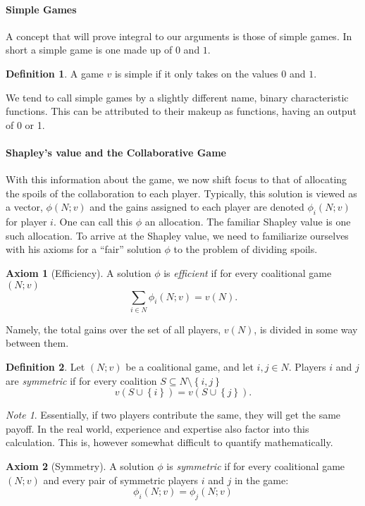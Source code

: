 \documentclass[12pt,letterpaper,final]{article}
\theoremstyle{plain}
\theoremstyle{plain}
\theoremstyle{plain}
\theoremstyle{plain}
\theoremstyle{plain}
\theoremstyle{plain}
\theoremstyle{plain}
\theoremstyle{definition}
\newtheorem{definition}{Definition}[section]
\theoremstyle{definition}
\theoremstyle{definition}
\theoremstyle{definition}
\theoremstyle{definition}
\newtheorem{axiom}{Axiom}[section]
\theoremstyle{remark}
\theoremstyle{remark}
\newtheorem*{note}{Note}
\theoremstyle{remark}
\theoremstyle{remark}
\begin{document}
\paragraph{Simple Games}

A concept that will prove integral to our arguments is those of simple
games. In short a simple game is one made up of \(0\) and \(1\).

\begin{definition}
  A game \(v\) is simple if it only takes on the values \(0\) and
  \(1\).
\end{definition}

We tend to call simple games by a slightly different name, binary
characteristic functions. This can be attributed to their makeup as
functions, having an output of 0 or 1.

\paragraph{Shapley's value and the Collaborative Game}

With this information about the game, we now shift focus to that of
allocating the spoils of the collaboration to each player. Typically,
this solution is viewed as a vector, \(\phi(N;v)\) and the gains
assigned 
to each player are denoted \(\phi_i(N;v)\) for player \(i\). One can
call 
this \(\phi\) an allocation. The familiar
Shapley value is one such allocation. To arrive at the Shapley value,
we need 
to familiarize ourselves with his axioms for a ``fair'' solution
\(\phi\) to the problem of dividing spoils. 

\begin{axiom}[Efficiency]\label{ax:eff}
  A solution \(\phi\) is \emph{efficient} if for every
  coalitional game \((N;v)\)
  \[\sum_{i \in N} \phi_i(N;v) = v(N).\] 
\end{axiom}

Namely, the total gains over the set of all players, \(v(N)\), is
divided in some way between them.

\begin{definition}
  Let \((N;v)\) be a coalitional game, and let \(i, j \in N\). Players
  \(i\) 
  and \(j\) are \emph{symmetric} if for every coalition 
  \(S \subseteq N \setminus \left\{i,j\right\} \)
  \[v(S\cup \left\{i\right\}) = v(S \cup \left\{j\right\}).\]
\end{definition}

\begin{note}
  Essentially, if two players contribute the same, 
  they will get the same payoff. In the real world, experience
  and expertise also factor into this calculation. This is, however
  somewhat difficult to quantify mathematically.
\end{note}
\begin{axiom}[Symmetry]\label{ax:sym}
  A solution \(\phi\) is \emph{symmetric} if for every coalitional
  game \((N;v)\) and every pair of symmetric players \(i\) and \(j\)
  in the game: 
  \[\phi_i(N;v) = \phi_j(N;v)\]
\end{axiom}
\end{document}
